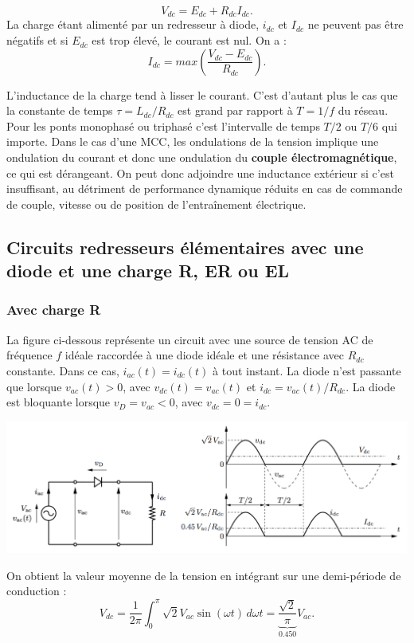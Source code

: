 			\begin{equation}
				V_{dc} = E_{dc} + R_{dc} I_{dc}.
			\end{equation}
			La charge étant alimenté par un redresseur à diode, $i_{dc}$ et $I_{dc}$ ne peuvent pas être négatifs et si $E_{dc}$ est trop élevé, le courant est nul. On a :
			\begin{equation}
				I_{dc} = max\left(\frac{V_{dc} - E_{dc}}{R_{dc}}\right).
			\end{equation}
			
			L'inductance de la charge tend à lisser le courant. C'est d'autant plus le cas que la constante de temps $\tau = L_{dc}/R_{dc}$ est grand par rapport à $T=1/f$ du réseau. Pour les ponts monophasé ou triphasé c'est l'intervalle de temps $T/2$ ou $T/6$ qui importe. Dans le cas d'une MCC, les ondulations de la tension implique une ondulation du courant et donc une ondulation du \textbf{couple électromagnétique}, ce qui est dérangeant. On peut donc adjoindre une inductance extérieur si c'est insuffisant, au détriment de performance dynamique réduits en cas de commande de couple, vitesse ou de position de l'entraînement électrique. 
			
		\subsection{Circuits redresseurs élémentaires avec une diode et une charge R, ER ou EL}
			\subsubsection{Avec charge R}
				La figure ci-dessous représente un circuit avec une source de tension AC de fréquence $f$ idéale raccordée à une diode idéale et une résistance avec $R_{dc}$ constante. Dans ce cas, $i_{ac}(t)=i_{dc}(t)$ à tout instant. La diode n'est passante que lorsque $v_{ac}(t)>0$, avec $v_{dc}(t)=v_{ac}(t)$ et $i_{dc}=v_{ac}(t)/R_{dc}$. La diode est bloquante lorsque $v_D=v_{ac}<0$, avec $v_{dc}=0=i_{dc}$.
				
				\begin{center}
					\includegraphics[scale=0.45]{ch2/3}
				\end{center}
				
				On obtient la valeur moyenne de la tension en intégrant sur une demi-période de conduction :
				\begin{equation}
					V_{dc} = \frac{1}{2\pi} \int _0^\pi \sqrt{2}V_{ac}\sin (\omega t) \, d\omega t = \underbrace{\frac{\sqrt{2}}{\pi}}_{0.450} V_{ac}.
				\end{equation}
				